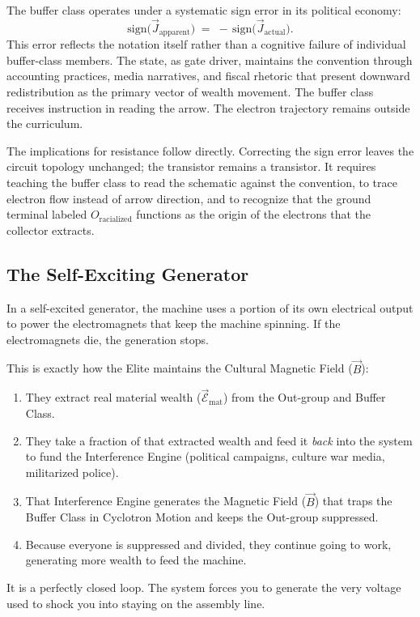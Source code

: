 \begin{theorem}\label{thm:sign-error}
The buffer class operates under a systematic sign error in its political economy:
\begin{equation}\label{eq:13.20-misperception-condition}
\text{sign}\bigl(\vec{J}_{\text{apparent}}\bigr) \;=\; -\,\text{sign}\bigl(\vec{J}_{\text{actual}}\bigr) .
\end{equation}
This error reflects the notation itself rather than a cognitive failure of individual buffer-class members. The state, as gate driver, maintains the convention through accounting practices, media narratives, and fiscal rhetoric that present downward redistribution as the primary vector of wealth movement. The buffer class receives instruction in reading the arrow. The electron trajectory remains outside the curriculum.
\end{theorem}

The implications for resistance follow directly. Correcting the sign error leaves the circuit topology unchanged; the transistor remains a transistor. It requires teaching the buffer class to read the schematic against the convention, to trace electron flow instead of arrow direction, and to recognize that the ground terminal labeled $O_{\text{racialized}}$ functions as the origin of the electrons that the collector extracts.

\subsection{The Self-Exciting Generator}

In a self-excited generator, the machine uses a portion of its own electrical output to power the electromagnets that keep the machine spinning. If the electromagnets die, the generation stops.

\begin{definition}
This is exactly how the Elite maintains the Cultural Magnetic Field ($\vec{B}$):
\begin{enumerate}
\item They extract real material wealth ($\vec{\mathcal{E}}_{\text{mat}}$) from the Out-group and Buffer Class.
\item They take a fraction of that extracted wealth and feed it \emph{back} into the system to fund the Interference Engine (political campaigns, culture war media, militarized police).
\item That Interference Engine generates the Magnetic Field ($\vec{B}$) that traps the Buffer Class in Cyclotron Motion and keeps the Out-group suppressed.
\item Because everyone is suppressed and divided, they continue going to work, generating more wealth to feed the machine.
\end{enumerate}

It is a perfectly closed loop. The system forces you to generate the very voltage used to shock you into staying on the assembly line.
\end{definition}

